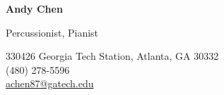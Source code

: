 \documentclass[11pt]{article}
\begin{document}
	
	\begin{minipage}[t]{0.45\textwidth}
		\hspace{-16pt}
		\huge{\textbf{Andy Chen}}
		
		\vspace{4pt}
		\large{Percussionist, Pianist}
	\end{minipage}
	\begin{minipage}[t]{0.51\textwidth}
		\vspace{-8pt}
		330426 Georgia Tech Station, Atlanta, GA 30332\\
		(480) 278-5596\\
		\href{mailto:achen87@gatech.edu}{achen87@gatech.edu}
	\end{minipage}
	
	
	
	
	
	
	
	
	
	
	
\end{document}
